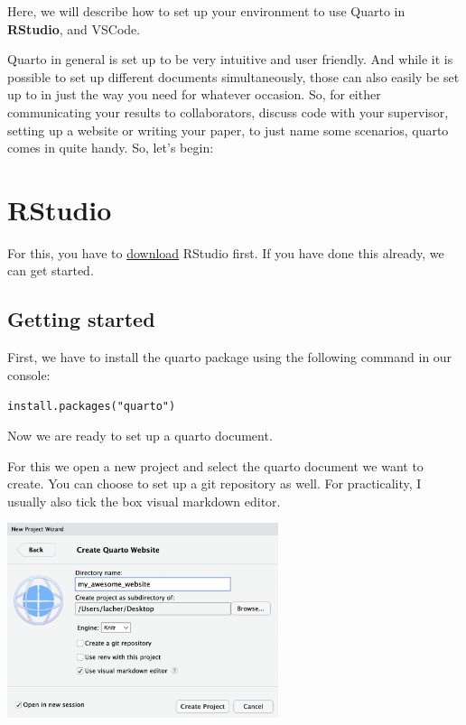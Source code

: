 \documentclass[
  letterpaper,
  DIV=11,
  numbers=noendperiod]{scrreprt}
\begin{document}
Here, we will describe how to set up your environment to use Quarto in
\textbf{RStudio}, and VSCode.

Quarto in general is set up to be very intuitive and user friendly. And
while it is possible to set up different documents simultaneously, those
can also easily be set up to in just the way you need for whatever
occasion. So, for either communicating your results to collaborators,
discuss code with your supervisor, setting up a website or writing your
paper, to just name some scenarios, quarto comes in quite handy. So,
let's begin:

\hypertarget{rstudio}{%
\section{RStudio}\label{rstudio}}

For this, you have to
\href{https://posit.co/download/rstudio-desktop/}{download} RStudio
first. If you have done this already, we can get started.

\hypertarget{getting-started}{%
\subsection{Getting started}\label{getting-started}}

First, we have to install the quarto package using the following command
in our console:

\texttt{install.packages("quarto")}

Now we are ready to set up a quarto document.

For this we open a new project and select the quarto document we want to
create. You can choose to set up a git repository as well. For
practicality, I usually also tick the box visual markdown editor.

\includegraphics[width=3.125in,height=\textheight]{img/quarto_intro/Screenshot 2023-10-11 at 11.34.16.png}
\end{document}
